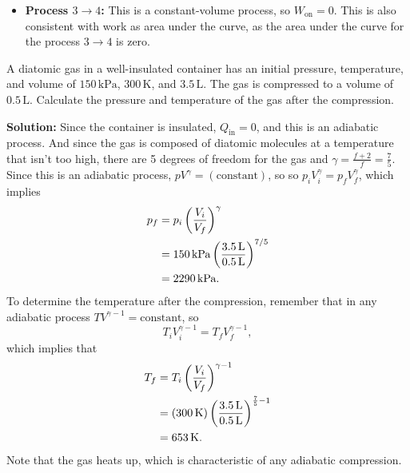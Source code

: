 \begin{example}
\begin{itemize}
\item \textbf{Process $3 \rightarrow 4$:} This is a constant-volume process,
so $W_\text{on} = 0$. This is also consistent with work as area under the 
curve, as the area under the curve for the process $3 \rightarrow 4$ is
zero.
\end{itemize}
\end{example}

\begin{example}

A diatomic gas in a well-insulated container has an initial pressure,
temperature, and volume of $150\,\text{kPa}$, $300\,\text{K}$, and
$3.5\,\text{L}$.  The gas is compressed to a volume of $0.5\,\text{L}$.
Calculate the pressure and temperature of the gas after the compression.

\textbf{Solution:} Since the container is insulated, $Q_\text{in}=0$, 
and  this is an adiabatic process.  And since the gas is
composed of diatomic molecules at a temperature that isn't too high,
there are 5 degrees of freedom for the gas and $\gamma = \frac{f+2}{f} = 
\frac{7}{5}$.
Since this is an adiabatic process, $pV^{\gamma} = (\text{constant})$, so
so $p_iV_i^\gamma = p_fV_f^\gamma$, which implies
\begin{eqnarray}
 p_f =\mathstrut & p_i\left(\frac{V_i}{V_f}\right)^\gamma  \\
     =\mathstrut & 150 \,\text{kPa}\left(\frac{3.5 \,\text{L}}{0.5 \,\text{L}}\right)^{7/5}
            \\
     =\mathstrut & 2290\,\text{kPa}.
\end{eqnarray}
To determine the temperature after the compression, remember that in 
any adiabatic process $TV^{\gamma - 1} = \text{constant}$, so 
\begin{equation}
T_iV_i^{\gamma - 1} = T_fV_f^{\gamma - 1},
\end{equation} 
which implies that
\begin{eqnarray}
T_f =\mathstrut & T_i\left(\frac{V_i}{V_f}\right)^{\gamma - 1}   \\
    =\mathstrut & (300 \,\text{K})\left(\frac{3.5 \,\text{L}}{0.5 \,\text{L}}
                 \right)^{\frac{7}{5}-1} 
            \\
    =\mathstrut & 653 \,\text{K}.
\end{eqnarray}  
Note that the gas heats up, which is characteristic of any adiabatic 
compression.
\end{example}

